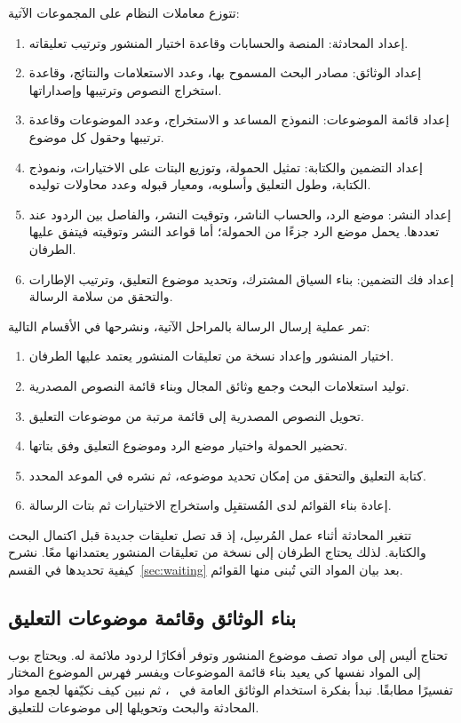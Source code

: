 تتوزع معاملات النظام على المجموعات الآتية:
\begin{enumerate}
\item إعداد المحادثة: المنصة والحسابات وقاعدة اختيار المنشور وترتيب تعليقاته.
\item إعداد الوثائق: مصادر البحث المسموح بها، وعدد الاستعلامات والنتائج، وقاعدة استخراج النصوص وترتيبها وإصداراتها.
\item إعداد قائمة الموضوعات: النموذج المساعد و الاستخراج، وعدد الموضوعات وقاعدة ترتيبها وحقول كل موضوع.
\item إعداد التضمين والكتابة: تمثيل الحمولة، وتوزيع البتات على الاختيارات، ونموذج الكتابة، وطول التعليق وأسلوبه، ومعيار قبوله وعدد محاولات توليده.
\item إعداد النشر: موضع الرد، والحساب الناشر، وتوقيت النشر، والفاصل بين الردود عند تعددها. يحمل موضع الرد جزءًا من الحمولة؛ أما قواعد النشر وتوقيته فيتفق عليها الطرفان.
\item إعداد فك التضمين: بناء السياق المشترك، وتحديد موضوع التعليق، وترتيب الإطارات والتحقق من سلامة الرسالة.
\end{enumerate}

تمر عملية إرسال الرسالة بالمراحل الآتية، ونشرحها في الأقسام التالية:
\begin{enumerate}
\item اختيار المنشور وإعداد نسخة من تعليقات المنشور يعتمد عليها الطرفان.
\item توليد استعلامات البحث وجمع وثائق المجال وبناء قائمة النصوص المصدرية.
\item تحويل النصوص المصدرية إلى قائمة مرتبة من موضوعات التعليق.
\item تحضير الحمولة واختيار موضع الرد وموضوع التعليق وفق بتاتها.
\item كتابة التعليق والتحقق من إمكان تحديد موضوعه، ثم نشره في الموعد المحدد.
\item إعادة بناء القوائم لدى المُستقبِل واستخراج الاختيارات ثم بتات الرسالة.
\end{enumerate}
تتغير المحادثة أثناء عمل المُرسِل، إذ قد تصل تعليقات جديدة قبل اكتمال البحث والكتابة. لذلك يحتاج الطرفان إلى نسخة من تعليقات المنشور يعتمدانها معًا. نشرح كيفية تحديدها في القسم~\ref{sec:waiting} بعد بيان المواد التي تُبنى منها القوائم.

\subsection{بناء الوثائق وقائمة موضوعات التعليق}
\label{sec:search_determinism}
تحتاج أليس إلى مواد تصف موضوع المنشور وتوفر أفكارًا لردود ملائمة له. ويحتاج بوب إلى المواد نفسها كي يعيد بناء قائمة الموضوعات ويفسر فهرس الموضوع المختار تفسيرًا مطابقًا.
نبدأ بفكرة استخدام الوثائق العامة في ~\cite{zillien2024oppression}، ثم نبين كيف نكيّفها لجمع مواد المحادثة والبحث وتحويلها إلى موضوعات للتعليق.

